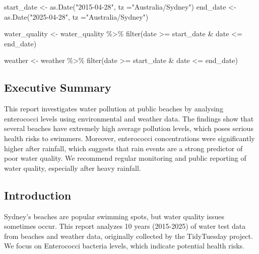 \documentclass[
  11pt,
]{article}
\newenvironment{Shaded}{\begin{snugshade}}{\end{snugshade}}
\newcommand{\AttributeTok}[1]{\textcolor[rgb]{0.40,0.45,0.13}{#1}}
\newcommand{\FunctionTok}[1]{\textcolor[rgb]{0.28,0.35,0.67}{#1}}
\newcommand{\NormalTok}[1]{\textcolor[rgb]{0.00,0.23,0.31}{#1}}
\newcommand{\OtherTok}[1]{\textcolor[rgb]{0.00,0.23,0.31}{#1}}
\newcommand{\SpecialCharTok}[1]{\textcolor[rgb]{0.37,0.37,0.37}{#1}}
\newcommand{\StringTok}[1]{\textcolor[rgb]{0.13,0.47,0.30}{#1}}
\begin{document}
\begin{Shaded}
\begin{Highlighting}[]
\NormalTok{start\_date }\OtherTok{\textless{}{-}} \FunctionTok{as.Date}\NormalTok{(}\StringTok{"2015{-}04{-}28"}\NormalTok{, }\AttributeTok{tz =}\StringTok{"Australia/Sydney"}\NormalTok{)}
\NormalTok{end\_date }\OtherTok{\textless{}{-}} \FunctionTok{as.Date}\NormalTok{(}\StringTok{"2025{-}04{-}28"}\NormalTok{, }\AttributeTok{tz =}\StringTok{"Australia/Sydney"}\NormalTok{)}

\NormalTok{water\_quality }\OtherTok{\textless{}{-}}\NormalTok{ water\_quality }\SpecialCharTok{\%\textgreater{}\%}
  \FunctionTok{filter}\NormalTok{(date }\SpecialCharTok{\textgreater{}=}\NormalTok{ start\_date }\SpecialCharTok{\&}\NormalTok{ date }\SpecialCharTok{\textless{}=}\NormalTok{ end\_date)}

\NormalTok{weather }\OtherTok{\textless{}{-}}\NormalTok{ weather }\SpecialCharTok{\%\textgreater{}\%}
  \FunctionTok{filter}\NormalTok{(date }\SpecialCharTok{\textgreater{}=}\NormalTok{ start\_date }\SpecialCharTok{\&}\NormalTok{ date }\SpecialCharTok{\textless{}=}\NormalTok{ end\_date)}
\end{Highlighting}
\end{Shaded}

\subsection{Executive Summary}\label{executive-summary}

This report investigates water pollution at public beaches by analysing
enterococci levels using environmental and weather data. The findings
show that several beaches have extremely high average pollution levels,
which poses serious health risks to swimmers. Moreover, enterococci
concentrations were significantly higher after rainfall, which suggests
that rain events are a strong predictor of poor water quality. We
recommend regular monitoring and public reporting of water quality,
especially after heavy rainfall.

\subsection{Introduction}\label{introduction}

Sydney's beaches are popular swimming spots, but water quality issues
sometimes occur. This report analyzes 10 years (2015-2025) of water test
data from beaches and weather data, originally collected by the
TidyTuesday project. We focus on Enterococci bacteria levels, which
indicate potential health risks.
\end{document}
